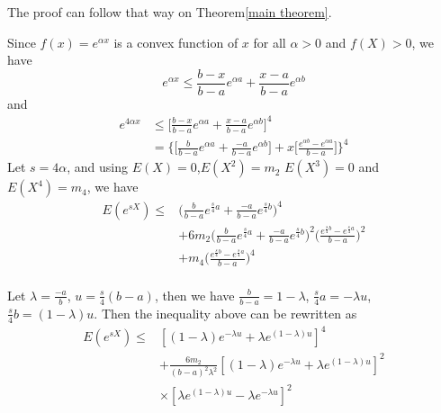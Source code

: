 \documentclass[journal]{IEEEtran}
\begin{document}
\begin{IEEEproof}
The proof can follow that way on Theorem\ref{main theorem}.

Since $f(x)=e^{\alpha x}$ is a convex function of $x$ for all $\alpha >0$ and $f(X)>0$, we have
\begin{equation}
  e^{\alpha x}\leq \frac{b-x}{b-a}e^{\alpha a}+\frac{x-a}{b-a}e^{\alpha b}
\end{equation}
and
\begin{equation}
\begin{split}
   e^{4\alpha x} {}&\leq \Big[\frac{b-x}{b-a}e^{\alpha a}+\frac{x-a}{b-a}e^{\alpha b}\Big]^4{}\\
   &=\Big\{\Big[\frac{b}{b-a}e^{\alpha a}+\frac{-a}{b-a}e^{\alpha b}\Big]+x\Big[\frac{e^{\alpha b}-e^{\alpha a}}{b-a}\Big]\Big\}^4
      \end{split}
\end{equation}
Let $s=4\alpha$, and using  $E(X)=0$,$E(X^2)=m_2$ $E(X^3)=0$ and $E(X^4)=m_4$, we have
\begin{equation}
\begin{split}
  E(e^{sX})\leq {}&\Big(\frac{b}{b-a}e^{\frac{s}{4} a}+\frac{-a}{b-a}e^{\frac{s}{4} b}\Big)^4{}\\
  &+6m_2\Big(\frac{b}{b-a}e^{\frac{s}{4} a}+\frac{-a}{b-a}e^{\frac{s}{4} b}\Big)^2\Big(\frac{e^{\frac{s}{4} b}-e^{\frac{s}{4} a}}{b-a}\Big)^2\\
  &+m_4\Big(\frac{e^{\frac{s}{4} b}-e^{\frac{s}{4} a}}{b-a}\Big)^4
  \end{split}
\end{equation}
\\
Let $\lambda=\frac{-a}{b}$, $u=\frac{s}{4}(b-a)$, then we have
$\frac{b}{b-a}=1-\lambda$, $ \frac{s}{4}a=-\lambda u$, $\frac{s}{4}b=(1-\lambda) u$.
Then the inequality above can be rewritten as
\begin{align}
  E(e^{sX})\leq & [(1- \lambda) e^{-\lambda u}+\lambda e^{(1-\lambda)u}]^4 \\
  &+\frac{6 m_2}{(b-a)^2\lambda^2}[(1-\lambda)e^{-\lambda u}+\lambda e^{(1-\lambda)u}]^2\\
   & \times [\lambda e^{(1-\lambda)u}-\lambda e^{-\lambda u}]^2
   \end{align}


\end{IEEEproof}
\end{document}
